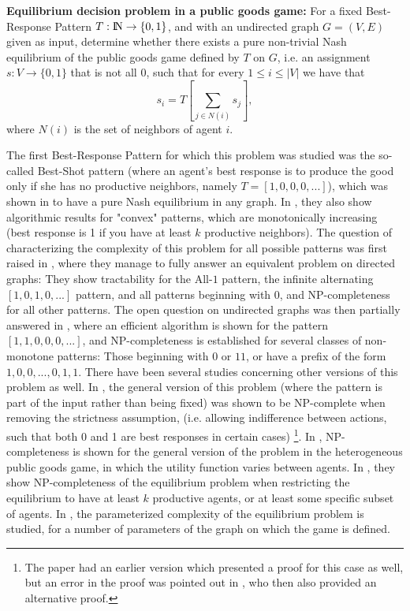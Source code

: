 \documentclass[runningheads]{llncs}
\begin{document}
\vspace{0.1in}
\noindent
{\bf Equilibrium decision problem in a public goods game:} For a fixed Best-Response Pattern $T:{\rm I\!N} \rightarrow \{0,1\}$, and with an undirected graph $G=(V,E)$ given as input, determine whether there exists a pure non-trivial Nash equilibrium of the public goods game defined by $T$ on $G$, i.e. an assignment $s:V \rightarrow \{0,1\}$ that is not all $0$, such that for every $1\leq i \leq |V|$ we have that 
\[s_i=T[\sum_{j\in N(i)}s_j],\]
where $N(i)$ is the set of neighbors of agent $i$.
\vspace{0.1in}

The first Best-Response Pattern for which this problem was studied was the so-called Best-Shot pattern (where an agent's best response is to produce the good only if she has no productive neighbors, namely $T=[1,0,0,0,...]$), which was shown in \cite{Best_Shot} to have a pure Nash equilibrium in any graph. In \cite{Best_Shot}, they also show algorithmic results for "convex" patterns, which are monotonically increasing (best response is 1 if you have at least $k$ productive neighbors). The question of characterizing the complexity of this problem for all possible patterns was first raised in \cite{Directed_Paper}, where they manage to fully answer an equivalent problem on directed graphs: They show tractability for the All-$1$ pattern, the infinite alternating $[1,0,1,0,...]$ pattern, and all patterns beginning with $0$, and NP-completeness for all other patterns. The open question on undirected graphs was then partially answered in \cite{Gilboa_Nisan_public_goods}, where an efficient algorithm is shown for the pattern $[1,1,0,0,0,...]$, and NP-completeness is established for several classes of non-monotone patterns: Those beginning with $0$ or $11$, or have a prefix of the form $1,0,0,...,0,1,1$. There have been several studies concerning other versions of this problem as well. In \cite{point_out_flaw}, the general version of this problem (where the pattern is part of the input rather than being fixed) was shown to be NP-complete when removing the strictness assumption, (i.e. allowing indifference between actions, such that both 0 and 1 are best responses in certain cases) \footnote{The paper \cite{general_homogeneous_flawed} had an earlier version \cite{general_homogeneous_corrected} which presented a proof for this case as well, but an error in the proof was pointed out in \cite{point_out_flaw}, who then also provided an alternative proof.}. In \cite{general_homogeneous_corrected}, NP-completeness is shown for the general version of the problem in the heterogeneous public goods game, in which the utility function varies between agents. In \cite{Modifications}, they show NP-completeness of the equilibrium problem when restricting the equilibrium to have at least $k$ productive agents, or at least some specific subset of agents. In \cite{Parameterized}, the parameterized complexity of the equilibrium problem is studied, for a number of parameters of the graph on which the game is defined.
\end{document}
